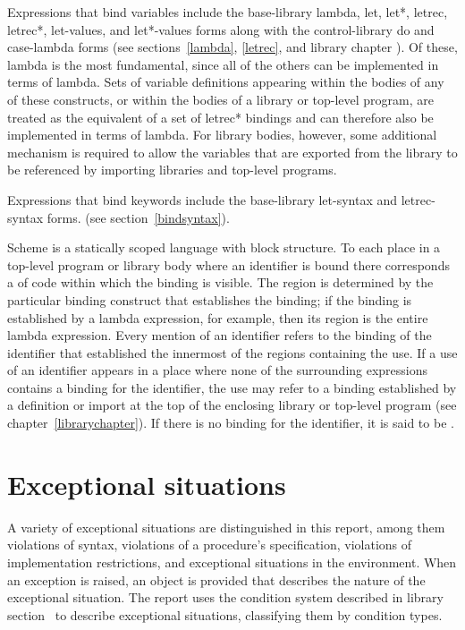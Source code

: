Expressions that bind variables include the base-library {\cf lambda},
{\cf let}, {\cf let*}, {\cf letrec}, {\cf letrec*}, {\cf let-values},
and {\cf let*-values} forms along with the control-library {\cf do} and
{\cf case-lambda} forms
(see sections~\ref{lambda}, \ref{letrec}, and library chapter
).
Of these, {\cf lambda} is the most fundamental, since all of the
others can be implemented in terms of {\cf lambda}.
Sets of variable definitions appearing within the bodies of any of
these constructs, or within the bodies of a library or top-level
program, are treated as the equivalent of a set of
{\cf letrec*} bindings and can therefore also be implemented in
terms of {\cf lambda}.
For library bodies, however, some additional mechanism is required to
allow the variables that are exported from the library to be referenced by
importing libraries and top-level programs.

Expressions that bind keywords include the base-library {\cf let-syntax}
and {\cf letrec-syntax} forms.
(see section~\ref{bindsyntax}).

\vest Scheme is a statically scoped language with
block structure.  To each place in a top-level program or library body where an identifier is bound 
there corresponds a  of code within which
the binding is visible.  The region is determined by the particular
binding construct that establishes the binding; if the binding is
established by a {\cf lambda} expression, for example, then its region
is the entire {\cf lambda} expression.  Every mention of an identifier
refers to the binding of the identifier that established the
innermost of the regions containing the use.  If a use of an
identifier appears in a place where none of the surrounding expressions
contains a binding for the identifier, the use may refer to a
binding established by a definition or import at the top of the
enclosing library or top-level program
(see chapter~\ref{librarychapter}).
If there is no binding for the identifier,
it is said to be .

\section{Exceptional situations}
\label{exceptionalsituationsection}

A variety of exceptional situations
are distinguished in this report, among them violations of 
syntax, violations of a procedure's specification, violations of
implementation restrictions, and exceptional situations in the
environment.  When an exception is raised, an object is provided that
describes the nature of the exceptional situation.  The report uses
the condition system described in library section~ to
describe exceptional situations, classifying them by condition types.

